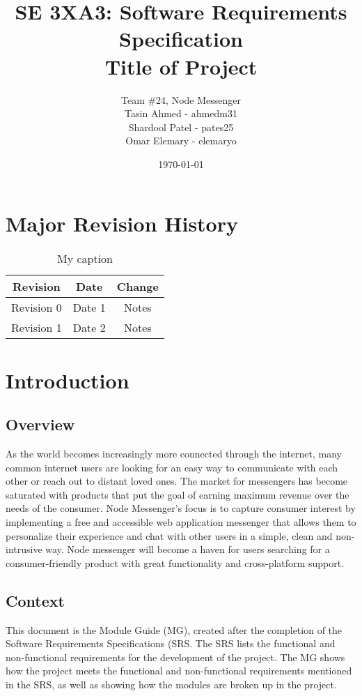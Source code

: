 \documentclass[12pt, titlepage]{article}
\title{SE 3XA3: Software Requirements Specification\\Title of Project}
\author{Team \#24, Node Messenger
		\\ Tasin Ahmed - ahmedm31
		\\ Shardool Patel - pates25
		\\ Omar Elemary - elemaryo
}
\date{\today}
\begin{document}
\maketitle

\tableofcontents
\listoftables
\listoffigures

\section{Major Revision History}
\begin{table}[h!]
\centering
\begin{tabular}{ccc}
\hline 
Revision & Date & Change \\ 
\hline 
Revision 0 & Date 1 & Notes \\ 
Revision 1 & Date 2 & Notes \\ 
\hline 
\end{tabular} 
\caption{My caption}
\label{my-label}
\end{table}


\section{Introduction}
\subsection{Overview}
As the world becomes increasingly more connected through the internet, many common internet users are looking for an easy way to communicate with each other or reach out to distant loved ones. The market for messengers has become saturated with products that put the goal of earning maximum revenue over the needs of the consumer. Node Messenger's focus is to capture consumer interest by implementing a free and accessible web application messenger that allows them to personalize their experience and chat with other users in a simple, clean and non-intrusive way. Node messenger will become a haven for users searching for a consumer-friendly product with great functionality and cross-platform support.

\subsection{Context}
This document is the Module Guide (MG), created after the completion of the Software Requirements Specifications (SRS. The SRS lists the functional and non-functional requirements for the development of the project. The MG shows how the project meets the functional and non-functional requirements mentioned in the SRS, as well as showing how the modules are broken up in the project.
\end{document}
